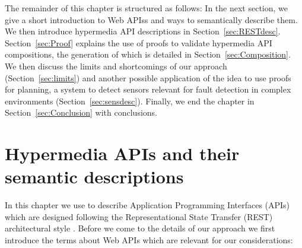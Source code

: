 The remainder of this chapter is structured as follows: %
% 
In the next section, we give a short introduction to Web APIss and ways to semantically describe them. %
We then introduce hypermedia API descriptions in Section~\ref{sec:RESTdesc}.
Section~\ref{sec:Proof} explains the use of proofs
to validate hypermedia API compositions,
the generation of which is detailed in Section~\ref{sec:Composition}.
We then discuss the limits and shortcomings of our approach (Section~\ref{sec:limits}) and another possible application of the idea to use proofs for planning, a system to detect 
sensors relevant for fault detection in complex environments (Section~\ref{sec:sensdesc}).
Finally, we end the chapter in Section~\ref{sec:Conclusion} with conclusions.

\section{Hypermedia APIs and their semantic descriptions}
In this chapter we use \nthreelogic to describe Application Programming Interfaces (APIs) which are designed following the
Representational
State Transfer (REST) architectural style \cite{REST}. Before we come to the details of our approach we first introduce
the terms about Web APIs which are relevant for our considerations:

